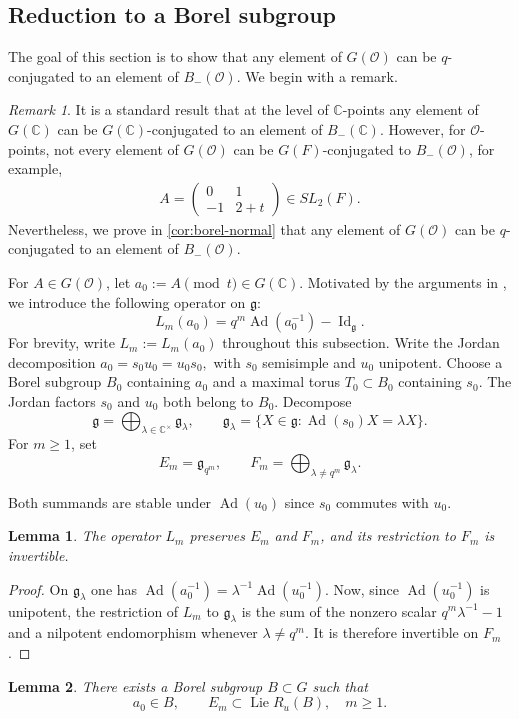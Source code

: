 \documentclass[11pt]{amsart}
\numberwithin{equation}{section}
\newtheorem{lemma}[lemma]{Lemma}
\theoremstyle{definition}
\theoremstyle{remark}
\newtheorem{remark}[remark]{Remark}
\begin{document}
\subsection{Reduction to a Borel subgroup} 
\label{sec:borel-normal} 
The goal of this section is to show that any element of $G(\mathcal{O})$ can be $q$-conjugated to an element of $B_{-}(\mathcal{O})$. We begin with a remark.
\begin{remark}
     It is a standard result that at the level of $\mathbb{C}$-points any element of $G(\mathbb{C})$ can be $G(\mathbb{C})$-conjugated to an element of $B_{-}(\mathbb{C})$.
    However, for $\mathcal{O}$-points, not every element of $G(\mathcal{O})$ can be $G(F)$-conjugated to $B_{-}(\mathcal{O})$, for example,
    \begin{align}
        A=\begin{pmatrix}
            0 & 1 \\
            -1 & 2+t
        \end{pmatrix}\in SL_2(F).
    \end{align}
    Nevertheless, we prove in \cref{cor:borel-normal} that any element of $G(\mathcal{O})$ can be $q$-conjugated to an element of $B_{-}(\mathcal{O})$.
\end{remark} 
For $A\in G(\mathcal{O})$, let $a_{0}:=A\pmod t\in G(\mathbb{C})$. Motivated by the arguments in \cite{BG}, we introduce the following operator on $\mathfrak{g}$:
\[
L_m(a_0)=q^m\operatorname{Ad}(a_0^{-1}) -\operatorname{Id}_{\mathfrak g}.
\] For brevity, write $L_m:=L_m(a_0)$ throughout this subsection.
Write the Jordan decomposition
$
  a_0=s_0u_0=u_0s_0,
$
with $s_0$ semisimple and $u_0$ unipotent.  Choose a Borel subgroup $B_0$ containing $a_0$ and a maximal torus $T_0\subset B_0$ containing $s_0$.  The Jordan factors $s_0$ and $u_0$ both belong to $B_0$.
Decompose
\[
  \mathfrak{g}=\bigoplus_{\lambda\in\mathbb{C}^\times}\mathfrak{g}_\lambda,
  \qquad
  \mathfrak{g}_\lambda=\{X\in\mathfrak{g}:\operatorname{Ad}(s_0)X=\lambda X\}.
\]
For $m\geq1$, set
\[
  E_m=\mathfrak{g}_{q^m},\qquad
  F_m=\bigoplus_{\lambda\neq q^m}\mathfrak{g}_\lambda.
\]

Both summands are stable under $\operatorname{Ad}(u_0)$ since $s_0$ commutes with $u_0$.

\begin{lemma}\label{lem:nonresonant}
The operator $L_m$ preserves $E_m$ and $F_m$, and its restriction to $F_m$ is invertible.
\end{lemma}

\begin{proof}
On $\mathfrak{g}_\lambda$ one has
$
  \operatorname{Ad}(a_0^{-1})=\lambda^{-1}\operatorname{Ad}(u_0^{-1}).
$
Now, since $\operatorname{Ad}(u_0^{-1})$ is unipotent, the restriction of $L_m$ to
$\mathfrak{g}_\lambda$ is the sum of the nonzero scalar
$q^m\lambda^{-1}-1$ and a nilpotent endomorphism whenever
$\lambda\neq q^m$.  It is therefore invertible on $F_m$.
\end{proof}
\begin{lemma}\label{lem:compatible-borel}
There exists a Borel subgroup $B\subset G$ such that
\[
  a_0\in B,
  \qquad
  E_m\subset\operatorname{Lie}R_u(B),\quad m\geq1.
\]
\end{lemma}
\end{document}
